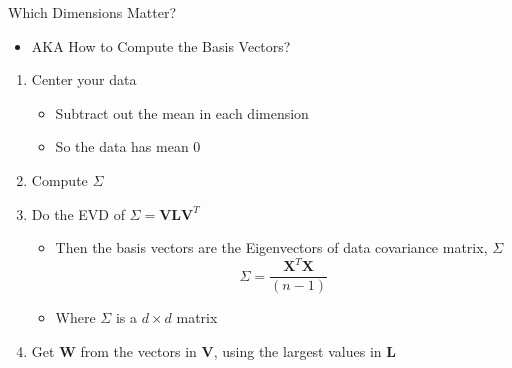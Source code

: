 \documentclass[aspectratio=169]{beamer}
\begin{document}
\begin{frame}{Which Dimensions Matter?}

\begin{itemize}
\item AKA How to Compute the Basis Vectors?
\end{itemize}
\begin{enumerate}
\item Center your data
\begin{itemize}
\item Subtract out the mean in each dimension
\item So the data has mean 0
\end{itemize}
\item Compute $\Sigma$
\item Do the EVD of $\Sigma =  \textbf{V}\textbf{L}\textbf{V}^T$
\begin{itemize}
\item Then the basis vectors are the Eigenvectors of data covariance matrix, $\Sigma$
 $$\Sigma = \frac{\textbf{X}^T\textbf{X}}{(n - 1)}$$
 \item Where $\Sigma$  is a $d \times d$ matrix
\end{itemize}
\item Get \textbf{W} from the vectors in \textbf{V}, using the largest values in \textbf{L}
\end{enumerate}
\end{frame}
\end{document}
